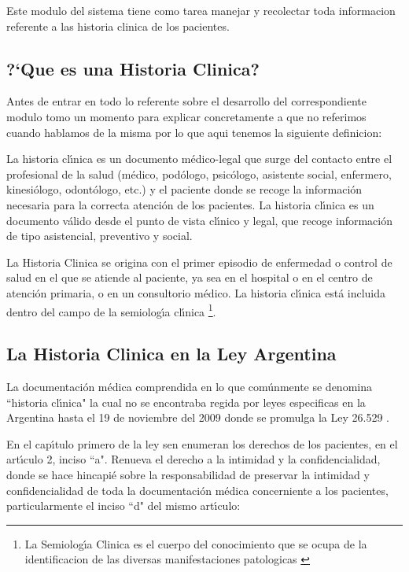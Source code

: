 Este modulo del sistema tiene como tarea manejar y recolectar toda informacion 
referente a las historia clinica de los pacientes.

\subsection{?`Que es una Historia Clinica?}

Antes de entrar en todo lo referente sobre el desarrollo del correspondiente modulo
tomo un momento para explicar concretamente a que no referimos cuando hablamos de 
la misma por lo que aqui tenemos la siguiente definicion:

La historia cl\'{\i}nica es un documento m\'edico-legal que surge del contacto entre el 
profesional de la salud (m\'edico, pod\'ologo, psic\'ologo, asistente social, enfermero, 
kinesi\'ologo, odont\'ologo, etc.) y el paciente donde se recoge la informaci\'on necesaria 
para la correcta atenci\'on de los pacientes. La historia cl\'{\i}nica es un documento 
v\'alido desde el punto de vista cl\'{\i}nico y legal, que recoge informaci\'on de tipo 
asistencial, preventivo y social.

La Historia Clinica se origina con el primer episodio de enfermedad o control de salud en 
el que se atiende al paciente, ya sea en el hospital o en el centro de atenci\'on primaria, 
o en un consultorio m\'edico. La historia cl\'{\i}nica est\'a incluida dentro del campo de la 
semiolog\'{\i}a cl\'{\i}nica \footnote{La Semiolog\'{\i}a Clinica es el cuerpo del conocimiento
que se ocupa de la identificacion de las diversas manifestaciones patologicas 
\cite{SemiClin}}.

\subsection{La Historia Clinica en la Ley Argentina}

La documentaci\'on m\'edica comprendida en lo que com\'unmente se denomina ``historia 
cl\'{\i}nica" la cual no se encontraba regida por leyes especificas en la Argentina hasta
el 19 de noviembre del 2009 donde se promulga la Ley 26.529 \cite{LeyHC}.

En el cap\'{\i}tulo primero de la ley sen enumeran los derechos de los pacientes, 
en el art\'{\i}culo 2, inciso ``a". Renueva el derecho a la intimidad y la confidencialidad, 
donde se hace hincapi\'e sobre la responsabilidad de preservar la intimidad y 
confidencialidad de toda la documentaci\'on m\'edica concerniente a los pacientes, 
particularmente el inciso ``d" del mismo art\'{\i}culo:


